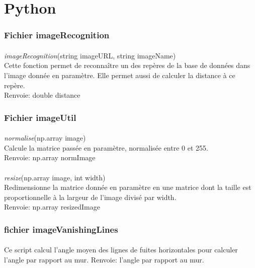 \documentclass[12pt]{report}
\begin{document}
\section{Python}

\subsubsection{Fichier imageRecognition}
\paragraph{}
\textit{imageRecognition}(string imageURL, string imageName)\\
Cette fonction permet de reconnaître un des repères de la base de données dans l'image donnée en paramètre. Elle permet aussi de calculer la distance à ce repère.\\
Renvoie: double distance

\subsubsection{Fichier imageUtil}

\paragraph{}
\textit{normalise}(np.array image)\\
Calcule la matrice passée en paramètre, normalisée entre 0 et 255.\\
Renvoie: np.array normImage

\paragraph{}
\textit{resize}(np.array image, int width)\\
Redimensionne la matrice donnée en paramètre en une matrice dont la taille est proportionnelle à la largeur de l'image divisé par width.\\
Renvoie: np.array resizedImage

\subsubsection{fichier imageVanishingLines}

\paragraph{}
Ce script calcul l'angle moyen des lignes de fuites horizontales pour calculer l'angle par rapport au mur.
Renvoie: l'angle par rapport au mur.
\end{document}
